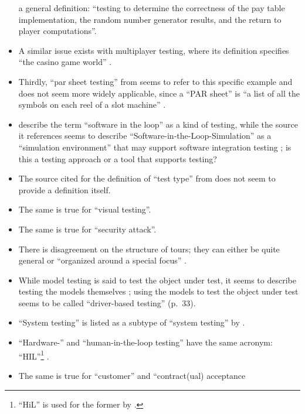 \begin{itemize}
            a general definition: ``testing to determine the correctness of the
            pay table implementation, the random number generator results, and
            the return to player computations''.
      \item A similar issue exists with multiplayer testing, where its
            definition specifies ``the casino game world'' \citepISTQB{}.
      \item Thirdly, ``par sheet testing'' from \citepISTQB{} seems to
            refer to this specific example and does not seem more widely
            applicable, since a ``PAR sheet'' is ``a list of all the symbols
            on each reel of a slot machine'' \citep{Bluejay2024}.
      \item \citetISTQB{} describe the term ``software in the loop'' as a
            kind of testing, while the source it references seems to describe
            ``Software-in-the-Loop-Simulation'' as a ``simulation environment''
            that may support software integration testing
            \citep[p.~153]{SPICE2022}; is this a testing approach or a tool
            that supports testing?
      \item The source cited for the definition of ``test type'' from
            \citepISTQB{} does not seem to provide a definition itself.
      \item The same is true for ``visual testing''.
      \item The same is true for ``security attack''.
            \fi
      \item There is disagreement on the structure of tours; they can either be
            quite general \citep[p.~34]{IEEE2022} or ``organized around a
            special focus'' \citepISTQB{}.
            \ifnotpaper
      \item While model testing is said to test the object under test,
            it seems to describe testing the models themselves
            \citet[p.~20]{Firesmith2015}; using the models to test the object
            under test seems to be called ``driver-based testing'' (p.~33).
      \item ``System testing'' is listed as a subtype of ``system testing'' by
            \citet[p.~23]{Firesmith2015}.
      \item ``Hardware-'' and ``human-in-the-loop testing'' have the same
            acronym: ``HIL''\footnote{``HiL'' is used for the former by
                  \citet[p.~2]{PreußeEtAl2012}.} \citep[p.~23]{Firesmith2015}.
      \item The same is true for ``customer'' and ``contract(ual) acceptance

\end{itemize}
